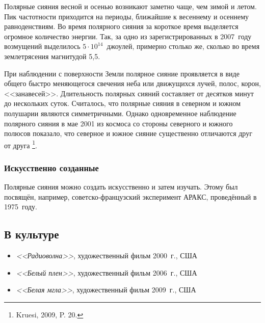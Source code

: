 \documentclass[a4paper,14pt]{article}
\begin{document}
	Полярные сияния весной и осенью возникают заметно чаще, чем зимой и летом. Пик частотности приходится на периоды, ближайшие к весеннему и осеннему равноденствиям. Во время полярного сияния за короткое время выделяется огромное количество энергии. Так, за одно из зарегистрированных в 2007~году возмущений выделилось $5\cdot10^{14}$~джоулей, примерно столько же, сколько во время землетрясения магнитудой 5,5.
	
	При наблюдении с поверхности Земли полярное сияние проявляется в виде общего быстро меняющегося свечения неба или движущихся лучей, полос, корон, <<занавесей>>. Длительность полярных сияний составляет от десятков минут до нескольких суток. Считалось, что полярные сияния в северном и южном полушарии являются симметричными. Однако одновременное наблюдение полярного сияния в мае 2001 из космоса со стороны северного и южного полюсов показало, что северное и южное сияние существенно отличаются друг от друга \footnote{Kruesi, 2009, P. 20.}.
	
	\subsubsection*{Искусственно созданные}
	
	Полярные сияния можно создать искусственно и затем изучать. Этому был посвящён, например, советско-французский эксперимент АРАКС, проведённый в 1975~году.
	
	\subsection*{В культуре}
	
	\begin{itemize}[label=\textcolor{blue}{\textbullet}]
		\item \textit{<<Радиоволна>>}, художественный фильм 2000~г., США
		\item \textit{<<Белый плен>>}, художественный фильм 2006~г., США
		\item \textit{<<Белая мгла>>}, художественный фильм 2009~г., США
	\end{itemize}
	
	\nocite{Kruesi2009}
	\nocite{Alexandrov2001}
	\nocite{Bulat1974}
	\nocite{Zvereva1988}
	\nocite{Isaev1980}
	\nocite{Mizun1983}
	\nocite{Mishin1989}

	\renewcommand{\refname}{Литература}
	\addcontentsline{toc}{subsection}{\refname}
	\printbibliography
	
\end{document}
